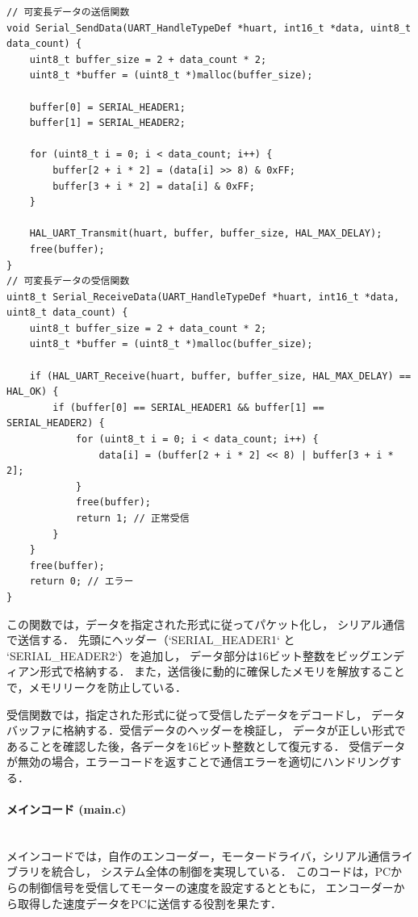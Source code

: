 \lstset{language=C, caption=可変長データの送受信関数 (serial\_lib.c)}

\begin{lstlisting}
// 可変長データの送信関数
void Serial_SendData(UART_HandleTypeDef *huart, int16_t *data, uint8_t data_count) {
    uint8_t buffer_size = 2 + data_count * 2;
    uint8_t *buffer = (uint8_t *)malloc(buffer_size);

    buffer[0] = SERIAL_HEADER1;
    buffer[1] = SERIAL_HEADER2;

    for (uint8_t i = 0; i < data_count; i++) {
        buffer[2 + i * 2] = (data[i] >> 8) & 0xFF;
        buffer[3 + i * 2] = data[i] & 0xFF;
    }

    HAL_UART_Transmit(huart, buffer, buffer_size, HAL_MAX_DELAY);
    free(buffer);
}
// 可変長データの受信関数
uint8_t Serial_ReceiveData(UART_HandleTypeDef *huart, int16_t *data, uint8_t data_count) {
    uint8_t buffer_size = 2 + data_count * 2;
    uint8_t *buffer = (uint8_t *)malloc(buffer_size);

    if (HAL_UART_Receive(huart, buffer, buffer_size, HAL_MAX_DELAY) == HAL_OK) {
        if (buffer[0] == SERIAL_HEADER1 && buffer[1] == SERIAL_HEADER2) {
            for (uint8_t i = 0; i < data_count; i++) {
                data[i] = (buffer[2 + i * 2] << 8) | buffer[3 + i * 2];
            }
            free(buffer);
            return 1; // 正常受信
        }
    }
    free(buffer);
    return 0; // エラー
}
\end{lstlisting}

この関数では，データを指定された形式に従ってパケット化し，
シリアル通信で送信する．
先頭にヘッダー（`SERIAL\_HEADER1` と `SERIAL\_HEADER2`）を追加し，
データ部分は16ビット整数をビッグエンディアン形式で格納する．
また，送信後に動的に確保したメモリを解放することで，メモリリークを防止している．

受信関数では，指定された形式に従って受信したデータをデコードし，
データバッファに格納する．受信データのヘッダーを検証し，
データが正しい形式であることを確認した後，各データを16ビット整数として復元する．
受信データが無効の場合，エラーコードを返すことで通信エラーを適切にハンドリングする．


\paragraph{メインコード (main.c)}\mbox{}\\
メインコードでは，自作のエンコーダー，モータードライバ，シリアル通信ライブラリを統合し，
システム全体の制御を実現している．
このコードは，PCからの制御信号を受信してモーターの速度を設定するとともに，
エンコーダーから取得した速度データをPCに送信する役割を果たす．

